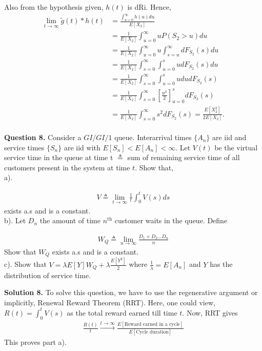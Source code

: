 \documentclass[12,a4paper,onecolumn]{article}
\begin{document}
Also from the hypothesis given, $h(t)$ is dRi. Hence,
\begin{align*}
\lim_{t \rightarrow \infty} \tilde{g}(t)*h(t)&=\frac{\int_{u=0}^{\infty}h(u)du}{E[X_2]}\\
&=\frac{1}{E[X_2]}\int_{u=0}^{\infty}uP(S_2>u)du\\
&=\frac{1}{E[X_2]}\int_{u=0}^{\infty}u\int_{s=u}^{\infty}dF_{S_2}(s)du\\
&=\frac{1}{E[X_2]}\int_{s=0}^{\infty}\int_{u=0}^{s}udF_{S_2}(s)du\\
&=\frac{1}{E[X_2]}\int_{s=0}^{\infty}\int_{u=0}^{s}udu dF_{S_2}(s)\\
&=\frac{1}{E[X_2]}\int_{s=0}^{\infty}[\frac{u^2}{2}]_{u=0}^{s} dF_{S_2}(s)\\
&=\frac{1}{E[X_2]}\int_{s=0}^{\infty}s^2 dF_{S_2}(s)=\frac{E[X_2^2]}{2E[X_2]}.\\
\end{align*}

\textbf{Question 8.} Consider a $GI/GI/1$ queue. Interarrival times $\{A_n\}$ are iid and service times $\{S_n\}$ are iid with $E[S_n]<E[A_n]<\infty$. Let $V(t)$ be the virtual service time in the queue at time t $\triangleq$ sum of remaining service time of all customers present in the system at time $t$. Show that,\\
a).  

\begin{align*}
V \triangleq \lim_{t \rightarrow \infty} \frac{1}{t}\int_{0}^{t}V(s)ds
\end{align*}
 exists a.s and is a constant. \\
 
 b). Let $D_n$ the amount of time $n^{\text{th}}$ customer waits in the queue. Define
 
 \begin{align*}
W_Q \triangleq \lim_{n \rightarrow \infty} \frac{D_1+D_2 \hdots D_n}{n}
\end{align*}
Show that $W_Q$ exists a.s and is a constant. \\

c). Show that $V=\lambda E[Y]W_Q+\lambda \frac{E[Y^2]}{2}$ where $\frac{1}{\lambda}=E[A_n]$ and $Y$ has the distribution of service time.

\textbf{Solution 8.} To solve this question, we have to use the regenerative argument or implicitly, Renewal Reward Theorem (RRT). Here, one could view, $R(t)=\int_{0}^{t}V(s)$ as the total reward earned till time $t$. Now, RRT gives 
\begin{align*}
\frac{R(t)}{t}\stackrel{t \rightarrow \infty}{\rightarrow}\frac{E[\text{Reward earned in a cycle}]}{E[\text{Cycle duration}]}
\end{align*} 
This proves part a).\\
\end{document}
